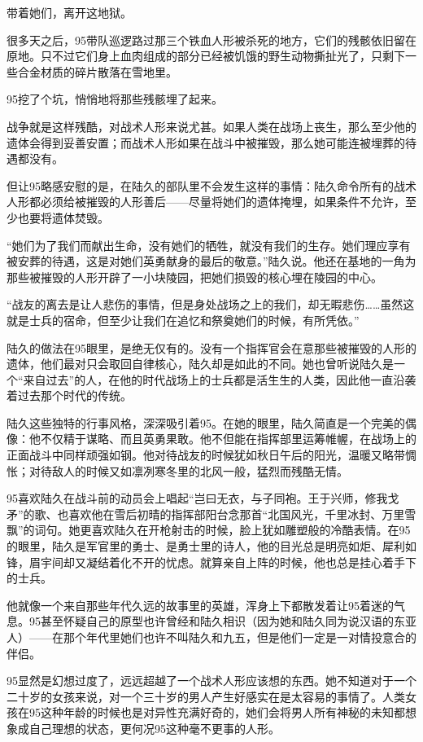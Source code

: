 带着她们，离开这地狱。

很多天之后，95带队巡逻路过那三个铁血人形被杀死的地方，它们的残骸依旧留在原地。只不过它们身上血肉组成的部分已经被饥饿的野生动物撕扯光了，只剩下一些合金材质的碎片散落在雪地里。

95挖了个坑，悄悄地将那些残骸埋了起来。

战争就是这样残酷，对战术人形来说尤甚。如果人类在战场上丧生，那么至少他的遗体会得到妥善安置；而战术人形如果在战斗中被摧毁，那么她可能连被埋葬的待遇都没有。

但让95略感安慰的是，在陆久的部队里不会发生这样的事情：陆久命令所有的战术人形都必须给被摧毁的人形善后——尽量将她们的遗体掩埋，如果条件不允许，至少也要将遗体焚毁。

“她们为了我们而献出生命，没有她们的牺牲，就没有我们的生存。她们理应享有被安葬的待遇，这是对她们英勇献身的最后的敬意。”陆久说。他还在基地的一角为那些被摧毁的人形开辟了一小块陵园，把她们损毁的核心埋在陵园的中心。

“战友的离去是让人悲伤的事情，但是身处战场之上的我们，却无暇悲伤……虽然这就是士兵的宿命，但至少让我们在追忆和祭奠她们的时候，有所凭依。”

陆久的做法在95眼里，是绝无仅有的。没有一个指挥官会在意那些被摧毁的人形的遗体，他们最对只会取回自律核心，陆久却是如此的不同。她也曾听说陆久是一个“来自过去”的人，在他的时代战场上的士兵都是活生生的人类，因此他一直沿袭着过去那个时代的传统。

陆久这些独特的行事风格，深深吸引着95。在她的眼里，陆久简直是一个完美的偶像：他不仅精于谋略、而且英勇果敢。他不但能在指挥部里运筹帷幄，在战场上的正面战斗中同样顽强如钢。他对待战友的时候犹如秋日午后的阳光，温暖又略带惆怅；对待敌人的时候又如凛冽寒冬里的北风一般，猛烈而残酷无情。

95喜欢陆久在战斗前的动员会上唱起“岂曰无衣，与子同袍。王于兴师，修我戈矛”的歌、也喜欢他在雪后初晴的指挥部阳台念那首“北国风光，千里冰封、万里雪飘”的词句。她更喜欢陆久在开枪射击的时候，脸上犹如雕塑般的冷酷表情。在95的眼里，陆久是军官里的勇士、是勇士里的诗人，他的目光总是明亮如炬、犀利如锋，眉宇间却又凝结着化不开的忧虑。就算亲自上阵的时候，他也总是挂心着手下的士兵。

他就像一个来自那些年代久远的故事里的英雄，浑身上下都散发着让95着迷的气息。95甚至怀疑自己的原型也许曾经和陆久相识（因为她和陆久同为说汉语的东亚人）——在那个年代里她们也许不叫陆久和九五，但是他们一定是一对情投意合的伴侣。

95显然是幻想过度了，远远超越了一个战术人形应该想的东西。她不知道对于一个二十岁的女孩来说，对一个三十岁的男人产生好感实在是太容易的事情了。人类女孩在95这种年龄的时候也是对异性充满好奇的，她们会将男人所有神秘的未知都想象成自己理想的状态，更何况95这种毫不更事的人形。

